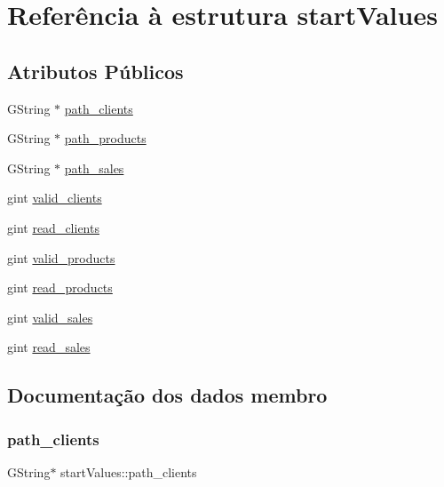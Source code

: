 \hypertarget{structstartValues}{}\section{Referência à estrutura start\+Values}
\label{structstartValues}
\subsection*{Atributos Públicos}
\begin{DoxyCompactItemize}
\item 
G\+String $\ast$ \hyperlink{structstartValues_a378cbec9caa0421436f7395535ed8dc8}{path\+\_\+clients}
\item 
G\+String $\ast$ \hyperlink{structstartValues_a565548dbdb1349b7bf63b00f86d7d231}{path\+\_\+products}
\item 
G\+String $\ast$ \hyperlink{structstartValues_a8de24ef63dba39c2fe312a04f47654d0}{path\+\_\+sales}
\item 
gint \hyperlink{structstartValues_aaa0344a5400c6c8143eb52e3b31bf337}{valid\+\_\+clients}
\item 
gint \hyperlink{structstartValues_ac489314bf5f33955dc8b0d6233653787}{read\+\_\+clients}
\item 
gint \hyperlink{structstartValues_a5ff53c4c14ef84d2e7c8e399fc17cf4c}{valid\+\_\+products}
\item 
gint \hyperlink{structstartValues_a3ef4f4c6de7029cd5bbd297334de5454}{read\+\_\+products}
\item 
gint \hyperlink{structstartValues_a5f9fab3890b3551496940dda2b6f9154}{valid\+\_\+sales}
\item 
gint \hyperlink{structstartValues_a407924d22b3d5f4cdd94b8e8b0d3edd3}{read\+\_\+sales}
\end{DoxyCompactItemize}


\subsection{Documentação dos dados membro}
\mbox{\label{structstartValues_a378cbec9caa0421436f7395535ed8dc8}} 
\subsubsection{\texorpdfstring{path\+\_\+clients}{path\_clients}}
{\footnotesize\ttfamily G\+String$\ast$ start\+Values\+::path\+\_\+clients}

